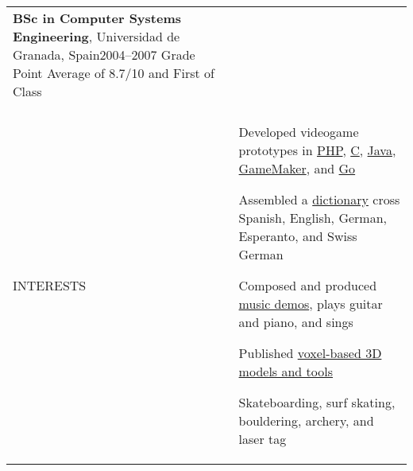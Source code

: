 \documentclass[letterpaper,10pt,oneside]{article}
\newcommand{\DatestampY}[1]{#1}
\newenvironment{body}
{\par\par
\begin{longtable}{p{0.142\textwidth}p{0.807\textwidth}}}
{\par\end{longtable}\par}
\renewcommand{\section}[3]{\\[-0.6cm]\pdfbookmark[2]{#2}{#3}\\%
\raggedleft  %
{\fontsize{9.5pt}{9.5pt}\selectfont\bfseries\raggedright%
\MakeUppercase{#1}}&}
\newcommand{\SmallEntryGap}{\par\vspace{0.27em}\par}
\begin{document}
\begin{body}
\SmallEntryGap

\textbf{BSc in Computer Systems Engineering}, Universidad de Granada, Spain\hfill \DatestampY{2004}--\DatestampY{2007} \newline
\phantom{w}Grade Point Average of 8.7/10 and First of Class


\section{Interests}{Interests}{PDF:Open Source}

Developed videogame prototypes in \href{https://github.com/lquesada/LifoSource}{PHP}, \href{https://github.com/lquesada/SpaceARMy}{C}, \href{https://github.com/lquesada/RogueCave}{Java}, \href{https://github.com/lquesada/PhysicsEngine}{GameMaker}, and \href{https://github.com/lquesada/Cavernal}{Go}

\SmallEntryGap

Assembled a \href{https://github.com/lquesada/Lingvaro}{dictionary} cross Spanish, English, German, Esperanto, and Swiss German

\SmallEntryGap

Composed and produced \href{https://github.com/lquesada/music}{music demos}, plays guitar and piano, and sings

\SmallEntryGap

Published \href{https://github.com/lquesada/voxel-3d-models}{voxel-based 3D models and tools}

\SmallEntryGap

Skateboarding, surf skating, bouldering, archery, and laser tag

\end{body}
\end{document}

